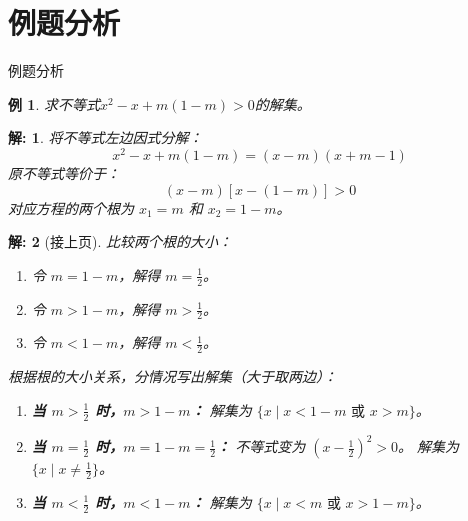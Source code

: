 \documentclass[aspectratio=169,13pt,fleqn,t] {beamer}
\newtheorem*{solve}{解:}
\newtheorem{instance}{例}   %
\begin{document}
\section{例题分析}
\begin{frame}[<+->]{例题分析}
	\vspace{-1.5em}


\begin{instance}
	求不等式$x^2 - x + m(1-m) > 0$的解集。
\end{instance}

\begin{solve}
	

将不等式左边因式分解：
\[
x^2 - x + m(1-m) = (x-m)(x + m - 1)
\]
原不等式等价于：
\[
(x-m)[x - (1-m)] > 0
\]
对应方程的两个根为 \(x_1 = m\) 和 \(x_2 = 1 - m\)。
\end{solve}
\end{frame}

\begin{frame}{}
	
\begin{solve}[接上页]
	

比较两个根的大小：
\begin{enumerate}[(1)]
	\item 令 \(m = 1 - m\)，解得 \(m = \frac{1}{2}\)。
	\item 令 \(m > 1 - m\)，解得 \(m > \frac{1}{2}\)。
	\item 令 \(m < 1 - m\)，解得 \(m < \frac{1}{2}\)。
\end{enumerate}

根据根的大小关系，分情况写出解集（大于取两边）：

\begin{enumerate}[(1)]
	\item \textbf{当 \(m > \frac{1}{2}\) 时，\(m > 1-m\)：}
	解集为 \(\{x \mid x < 1-m \text{ 或 } x > m\}\)。
	
	\item \textbf{当 \(m = \frac{1}{2}\) 时，\(m = 1-m = \frac{1}{2}\)：}
	不等式变为 \((x - \frac{1}{2})^2 > 0\)。
	解集为 \(\{x \mid x \neq \frac{1}{2}\}\)。
	
	\item \textbf{当 \(m < \frac{1}{2}\) 时，\(m < 1-m\)：}
	解集为 \(\{x \mid x < m \text{ 或 } x > 1-m\}\)。
\end{enumerate}
\end{solve}
\end{frame}
\end{document}

